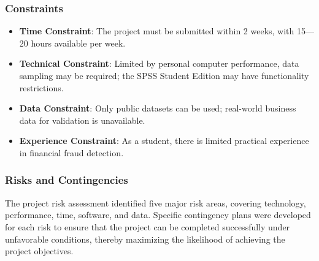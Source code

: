 \documentclass[sigplan,screen]{acmart}
\begin{document}
\subsubsection{Constraints}

\begin{itemize}
\item \textbf{Time Constraint}: The project must be submitted within 2 weeks, with 15---20 hours available per week.
\item \textbf{Technical Constraint}: Limited by personal computer performance, data sampling may be required; the SPSS Student Edition may have functionality restrictions.
\item \textbf{Data Constraint}: Only public datasets can be used; real-world business data for validation is unavailable.
\item \textbf{Experience Constraint}: As a student, there is limited practical experience in financial fraud detection.
\end{itemize}



\subsubsection{Risks and Contingencies}

The project risk assessment identified five major risk areas, covering technology, performance, time, software, and data. Specific contingency plans were developed for each risk to ensure that the project can be completed successfully under unfavorable conditions, thereby maximizing the likelihood of achieving the project objectives.

\vspace{0.3cm}
\end{document}
